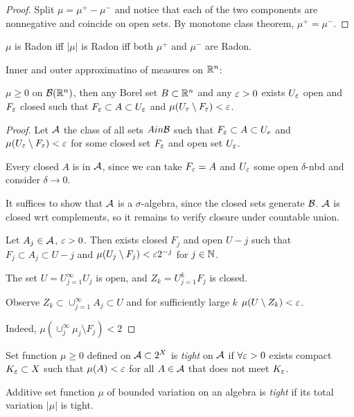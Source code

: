 \begin{proof}
  Split $\mu = \mu^+ - \mu^-$ and notice that each of the two
  components are nonnegative and coincide on open sets.
  By monotone class theorem, $\mu^+ = \mu^-$. 
\end{proof}

$\mu$ is Radon iff $\lvert \mu \rvert$ is Radon iff both $\mu^+$
and $\mu^-$ are Radon.

Inner and outer approximatino of measures on $\mathbb{R}^n$:

\begin{theorem}
  $\mu \geq 0$ on $\mathcal{B}(\mathbb{R}^n)$, then any Borel set $B \subset \mathbb{R}^n$ and
  any $\varepsilon > 0$ exists $U_\varepsilon$ open and $F_\varepsilon$ closed such that
  $F_\varepsilon \subset A \subset U_\varepsilon$ and $\mu(U_\varepsilon \setminus F_\varepsilon) < \varepsilon$.
\end{theorem}

\begin{proof}
  Let $\mathcal{A}$ the class of all sets $A in \mathcal{B}$ such that
  $F_\varepsilon \subset A \subset U_e$ and $\mu(U_\varepsilon \setminus F_\varepsilon) < \varepsilon$
  for some closed set $F_\varepsilon$ and open set $U_\varepsilon$.

  Every closed $A$ is in $\mathcal{A}$, since we can take
  $F_\varepsilon = A$ and $U_\varepsilon$ some open $\delta$-nbd
  and consider $\delta \to 0$.

  It suffices to show that $\mathcal{A}$ is a $\sigma$-algebra, since the closed
  sets generate $\mathcal{B}$. $\mathcal{A}$ is closed wrt complements, so it remains
  to verify closure under countable union.

  Let $A_j \in \mathcal{A}$, $\varepsilon > 0$. Then exists closed $F_j$
  and open $U-j$ such that $F_j \subset A_j \subset U-j$ and
  $\mu(U_j \setminus F_j) < \varepsilon 2^{-j}$ for $j \in \mathbb{N}$.

  The set $U = U_{j=1}^\infty U_j$ is open, and $Z_k = U_{j=1}^k F_j$ is closed.

  Observe $Z_k \subset \cup_{j=1}^\infty A_j \subset U$ and for
  sufficiently large $k$ $\mu(U \setminus Z_k) < \varepsilon$.

  Indeed, $\mu(\cup_j^\infty \mu_j \setminus F_j) < 2^{}$ 
\end{proof}

\begin{definition}
  Set function $\mu \geq 0$ defined on $\mathcal{A} \subset 2^X$
  is \emph{tight} on $\mathcal{A}$ if $\forall \varepsilon > 0$ exists compact
  $K_\varepsilon \subset X$ such that $\mu(A) < \varepsilon$ for all $A \in \mathcal{A}$
  that does not meet $K_\varepsilon$.

  Additive set function $\mu$ of bounded variation on an algebra is
  \emph{tight} if its total variation $\lvert \mu \rvert$ is tight.
\end{definition}

